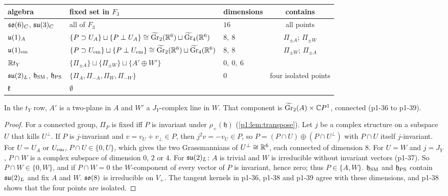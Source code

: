 \begin{theorem}
\label{p1:thm:fixed}
\begin{center}
\small
\begin{tabular}{@{}lllc@{}}
\toprule
algebra & fixed set in $F_3$ & dimensions & contains\\
\midrule
$\mathfrak{so}(6)_C$, $\mathfrak{su}(3)_C$ & all of $F_3$ & $16$ & all points\\
$\mathfrak{u}(1)_A$ & $\{P\supset U_A\}\sqcup\{P\perp U_A\}\cong\widetilde{\mathrm{Gr}}_2(\mathbb{R}^6)\sqcup\widetilde{\mathrm{Gr}}_4(\mathbb{R}^6)$ & $8,\ 8$ & $\Pi_{\pm A}$; $\Pi_{\pm W}$\\
$\mathfrak{u}(1)_{\rm em}$ & $\{P\supset U_{\rm em}\}\sqcup\{P\perp U_{\rm em}\}\cong\widetilde{\mathrm{Gr}}_2(\mathbb{R}^6)\sqcup\widetilde{\mathrm{Gr}}_4(\mathbb{R}^6)$ & $8,\ 8$ & $\Pi_{\pm W}$; $\Pi_{\pm A}$\\
$\mathbb{R} t_Y$ & $\{\Pi_{\pm A}\}\sqcup\{\Pi_{\pm W}\}\sqcup\{A'\oplus W'\}$ & $0,\ 0,\ 6$ & \\
$\mathfrak{su}(2)_L$, $\mathfrak h_{\rm SM}$, $\mathfrak h_{\rm PS}$ & $\{\Pi_A,\Pi_{-A},\Pi_W,\Pi_{-W}\}$ & $0$ & four isolated points\\
$\mathfrak k$ & $\emptyset$ & & \\
\bottomrule
\end{tabular}
\end{center}
In the $t_Y$ row, $A'$ is a two-plane in $A$ and $W'$ a $J_Y$-complex line in $W$. That component is $\widetilde{\mathrm{Gr}}_2(A)\times\mathbb{C} P^1$, connected (p1-36 to p1-39).
\end{theorem}

\begin{proof}
For a connected group, $\Pi_P$ is fixed iff $P$ is invariant under $\rho_+(\mathfrak h)$ (\cref{p1:lem:transpose}). Let $j$ be a complex structure on a subspace $U$ that kills
$U^\perp$. If $P$ is $j$-invariant and $v=v_U+v_\perp\in P$, then $j^2v=-v_U\in P$, so $P=(P\cap U)\oplus(P\cap U^\perp)$ with $P\cap U$ itself $j$-invariant. For $U=U_A$ or
$U_{\rm em}$, $P\cap U\in\{0,U\}$, which gives the two Grassmannians of $U^\perp\cong\mathbb{R}^6$, each connected of dimension $8$. For $U=W$ and $j=J_Y$, $P\cap W$ is a complex
subspace of dimension $0$, $2$ or $4$. For $\mathfrak{su}(2)_L$: $A$ is trivial and $W$ is irreducible without invariant vectors (p1-37). So $P\cap W\in\{0,W\}$, and if $P\cap W=0$
the $W$-component of every vector of $P$ is invariant, hence zero; thus $P\in\{A,W\}$. $\mathfrak h_{\rm SM}$ and $\mathfrak h_{\rm PS}$ contain $\mathfrak{su}(2)_L$ and fix $A$ and $W$. $\mathfrak{so}(8)$
is irreducible on $V_+$. The tangent kernels in p1-36, p1-38 and p1-39 agree with these dimensions, and p1-38 shows that the four points are isolated.
\end{proof}

